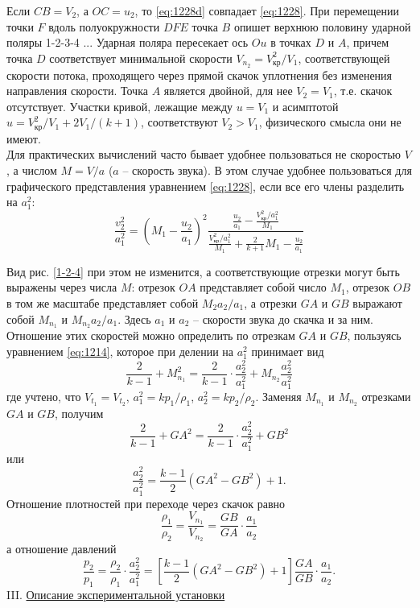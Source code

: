 \documentclass[specialist, subf, href, colorlinks=true, 14pt, final]{disser}
\theoremstyle{definition}
\begin{document}
Если $CB = V_2$, а $OC = u_2$, то \eqref{eq:1228d} совпадает  \eqref{eq:1228}. При перемещении точки $F$ вдоль полуокружности $DFE$ точка $B$ опишет верхнюю половину ударной поляры 1-2-3-4 ... Ударная поляра пересекает ось $Ou$ в точках $D$ и $A$, причем точка $D$ соответствует минимальной скорости $V_{n_2}=V_{\text{кр}}^{2}/V_{1}$, соответствующей скорости потока, проходящего через прямой скачок уплотнения без изменения направления скорости. Точка $A$ является двойной, для нее $V_{2} = V_{1}$, т.е. скачок отсутствует. Участки кривой, лежащие между $u = V_1$ и асимптотой $u = V_{\text{кр}}^{2}/V_{1} + 2V_{1}/(k+1)$, соответствуют $V_{2}>V_{1}$, физического смысла они не имеют.\\
Для практических вычислений часто бывает удобнее пользоваться не скоростью $V$, а числом $M = V/a$ ($a$ -- скорость звука). В этом случае удобнее пользоваться для графического представления уравнением \eqref{eq:1228}, если все его члены разделить на $a_{1}^{2}$:
{\Large
\[
  \frac{v_{2}^{2}}{a_{1}^{2}} = \left(M_{1}-\frac{u_{2}}{a_{1}}\right)^{2}\frac{\frac{u_2}{a_1} - \frac{V_{\text{кр}}^{2}/a_{1}^{2}}{M_1}}{\frac{V_{\text{кр}}^{2}/a_{1}^{2}}{M_1} + \frac{2}{k+1}M_{1} - \frac{u_2}{a_1}}
\]
}

Вид рис. \ref{1-2-4} при этом не изменится, а соответствующие отрезки могут быть выражены через числа $M$: отрезок $OA$ представляет собой число $M_1$, отрезок $OB$ в том же масштабе представляет собой $M_{2}a_{2}/a_{1}$, а отрезки $GA$ и $GB$ выражают собой $M_{n_1}$ и $M_{n_2}a_{2}/a_{1}$. Здесь $a_1$ и $a_2$ -- скорости звука до скачка и за ним. Отношение этих скоростей можно определить по отрезкам $GA$ и $GB$, пользуясь уравнением \eqref{eq:1214}, которое при делении на $a_{1}^{2}$ принимает вид
\[
  \frac{2}{k-1} + M_{n_1}^{2} = \frac{2}{k-1}\cdot\frac{a_{2}^{2}}{a_{1}^{2}} + M_{n_2}\frac{a_{2}^{2}}{a_{1}^{2}}
\]
где учтено, что $V_{t_1} = V_{t_2}$, $a_{1}^{2} = k p_{1}/\rho_{1}$, $a_{2}^{2} = k p_{2}/\rho_{2}$. Заменяя $M_{n_1}$ и $M_{n_2}$ отрезками $GA$ и $GB$, получим
\[
  \frac{2}{k-1} + GA^{2} = \frac{2}{k-1}\cdot\frac{a_{2}^{2}}{a_{1}^{2}} + GB^{2}
\]
или
\[ 
  \frac{a_{2}^{2}}{a_{1}^{2}} = \frac{k-1}{2}(GA^{2} - GB^{2}) + 1.
\]
Отношение плотностей при переходе через скачок равно
\[
  \frac{\rho_1}{\rho_2} = \frac{V_{n_1}}{V_{n_2}} = \frac{GB}{GA}\cdot\frac{a_1}{a_2}
\]
а отношение давлений
\[
  \frac{p_2}{p_1} = \frac{\rho_2}{\rho_1}\cdot\frac{a_{2}^{2}}{a_{1}^{2}} = \left[ \frac{k-1}{2}(GA^{2}-GB^{2})+1\right] \frac{GA}{GB}\cdot\frac{a_1}{a_2}.
\]
\newpage
\noindent III. \underline{Описание экспериментальной установки}
\end{document}
